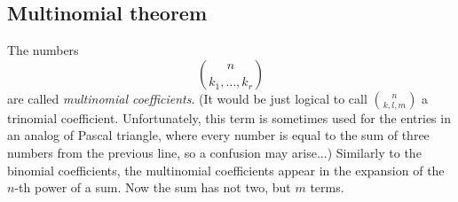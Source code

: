 \subsection{Multinomial theorem}
The numbers
\[
\binom{n}{k_1, \ldots, k_r}
\]
are called \emph{multinomial coefficients}.
(It would be just logical to call $\binom{n}{k, l, m}$ a trinomial coefficient.
Unfortunately, this term is sometimes used for the entries in an analog of Pascal triangle,
where every number is equal to the sum of three numbers from the previous line, so a confusion may arise...)
Similarly to the binomial coefficients, the multinomial coefficients appear in the expansion of the $n$-th power of a sum.
Now the sum has not two, but $m$ terms.
